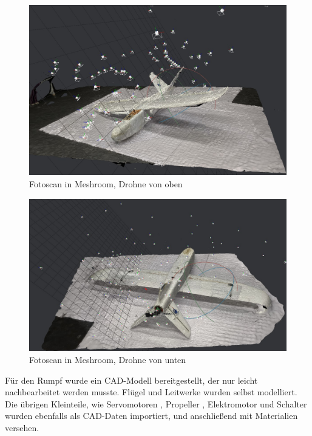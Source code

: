 \begin{figure}[H]
\begin{center}
\includegraphics[width=\textwidth]{gfx/prod/plane/meshroom2.jpg}
\caption{Fotoscan in Meshroom, Drohne von oben}
\label{meshroom1}
\end{center}
\end{figure}
%
\begin{figure}[H]
\begin{center}
\includegraphics[width=\textwidth]{gfx/prod/plane/meshroom1.jpg}
\caption{Fotoscan in Meshroom, Drohne von unten}
\label{meshroom2}
\end{center}
\end{figure}
\noindent
Für den Rumpf wurde ein CAD-Modell bereitgestellt, der nur leicht nachbearbeitet werden musste. Flügel und Leitwerke wurden selbst modelliert.\\
Die übrigen Kleinteile, wie Servomotoren , Propeller , Elektromotor  und Schalter  wurden ebenfalls als CAD-Daten importiert, und anschließend mit Materialien versehen.

